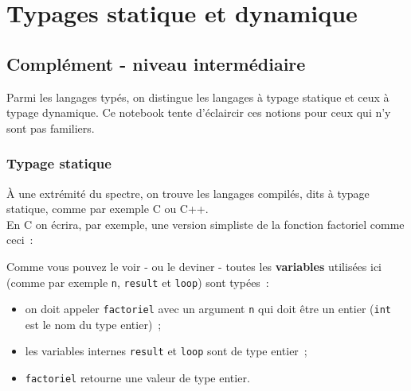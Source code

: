     \hypertarget{typages-statique-et-dynamique}{%
\section{Typages statique et
dynamique}\label{typages-statique-et-dynamique}}

    \hypertarget{compluxe9ment---niveau-intermuxe9diaire}{%
\subsection{Complément - niveau
intermédiaire}\label{compluxe9ment---niveau-intermuxe9diaire}}

    Parmi les langages typés, on distingue les langages à typage statique et
ceux à typage dynamique. Ce notebook tente d'éclaircir ces notions pour
ceux qui n'y sont pas familiers.

    \hypertarget{typage-statique}{%
\subsubsection{Typage statique}\label{typage-statique}}

    À une extrémité du spectre, on trouve les langages compilés, dits à
typage statique, comme par exemple C ou C++.\\

En C on écrira, par exemple, une version simpliste de la fonction
factoriel comme ceci~:

    \begin{Shaded}
\begin{Highlighting}[]
    \NormalTok{;}
    \NormalTok{ (}
\NormalTok{\}}
\end{Highlighting}
\end{Shaded}

    Comme vous pouvez le voir - ou le deviner - toutes les
\textbf{variables} utilisées ici (comme par exemple \texttt{n},
\texttt{result} et \texttt{loop}) sont typées~:

\begin{itemize}
\tightlist
\item
  on doit appeler \texttt{factoriel} avec un argument \texttt{n} qui
  doit être un entier (\texttt{int} est le nom du type entier)~;
\item
  les variables internes \texttt{result} et \texttt{loop} sont de type
  entier~;
\item
  \texttt{factoriel} retourne une valeur de type entier.
\end{itemize}


